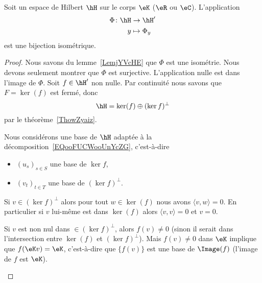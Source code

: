 \begin{theorem}        \label{ThoQgTovL}
	Soit un espace de Hilbert \( \hH\) sur le corps \( \eK\) (\( \eR\) ou \( \eC\)). L'application
	\begin{equation}
		\begin{aligned}
			\Phi\colon \hH & \to \hH'       \\
			y              & \mapsto \Phi_y
		\end{aligned}
	\end{equation}
	est une bijection isométrique.
\end{theorem}

\begin{proof}
	Nous savons du lemme~\ref{LemjYVcHE} que \(\Phi\) est une isométrie. Nous devons seulement montrer que \( \Phi\) est surjective. L'application nulle est dans l'image de \( \Phi\). Soit \( f\in \hH'\) non nulle. Par continuité nous savons que \( F=\ker(f)\) est fermé, donc
	\begin{equation}    \label{EQooFUCWooUnYcZG}
		\hH=\ker(f)\oplus(\ker f)^{\perp}
	\end{equation}
	par le théorème~\ref{ThowZyaiz}.

	\begin{subproof}

		Nous considérons une base de \( \hH\) adaptée à la décomposition~\ref{EQooFUCWooUnYcZG}, c'est-à-dire
		\begin{itemize}
			\item \( (u_s)_{s\in S}\) une base de \( \ker f\),
			\item
			      \( (v_t)_{t\in T}\) une base de \( (\ker f)^{\perp}\).
		\end{itemize}

		\spitem[\( (\ker f)^{\perp}\cap\ker(f)=\{ 0 \}  \)]

		Si \( v\in (\ker f)^{\perp}\) alors pour tout \( w\in \ker(f)\) nous avons \( \langle v, w\rangle =0\). En particulier si \( v\) lui-même est dans \( \ker(f)\) alors \( \langle v, v\rangle =0\) et \( v=0\).

		Si \( v\) est non nul dans \( \in (\ker f)^{\perp}\), alors \( f(v)\neq 0\) (sinon il serait dans l'intersection entre \( \ker(f)\) et \( (\ker f)^{\perp}\)). Mais \( f(v)\neq 0\) dans \( \eK\) implique que \( f(\eK v)=\eK\), c'est-à-dire que \( \{ f(v) \}\) est une base de \( \Image(f)\) (l'image de \( f\) est \( \eK\)).


\end{subproof}
\end{proof}
